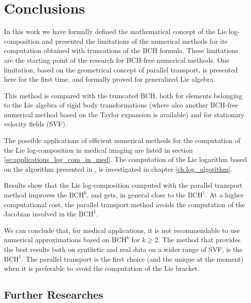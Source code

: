 
\chapter{Conclusions}\label{ch:conclusions}

In this work we have formally defined the mathematical concept of the Lie log-composition and presented the limitations of the numerical methods for its computation obtained with truncations of the BCH formula. These limitations are the starting point of the research for BCH-free numerical methods. 
One limitation, based on the geometrical concept of parallel transport, is presented here for the first time, and formally proved for generalized Lie algebra.

This method is compared with the truncated BCH, both for elements belonging to the Lie algebra of rigid body transformations (where also another BCH-free numerical method based on the Taylor expansion is available) and for stationary velocity fields (SVF).

The possible applications of efficient numerical methods for the computation of the Lie log-composition in medical imaging are listed in section \ref{se:applications_log_com_in_med}. The computation of the Lie logarithm based on the algorithm presented in \cite{bossa2008new}, is investigated in chapter \ref{ch:log_algorithm}.

Results show that the Lie log-composition computed with the parallel transport method improves the $\text{BCH}^0$, and gets, in general close to the $\text{BCH}^1$. At a higher computational cost, the parallel transport method avoids the computation of the Jacobian involved in the $\text{BCH}^1$.

We can conclude that, for medical applications, it is not recommendable to use numerical approximations based on $\text{BCH}^k$ for $k\geq 2$. The method that provides the best results both on synthetic and real data on a wider range of SVF, is the $\text{BCH}^1$. The parallel transport is the first choice (and the unique at the moment) when it is preferable to avoid the computation of the Lie bracket. 


\section{Further Researches}\label{se:further_research}

